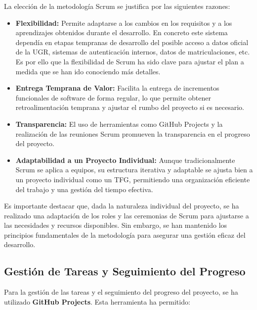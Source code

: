 La elección de la metodología Scrum se justifica por las siguientes razones:

\begin{itemize}
    \item \textbf{Flexibilidad:} Permite adaptarse a los cambios en los requisitos y a los aprendizajes obtenidos durante el desarrollo. En concreto este sistema dependía en etapas tempranas de desarrollo del posible acceso a datos oficial de la UGR, sistemas de autenticación internos, datos de matriculaciones, etc. Es por ello que la flexibilidad de Scrum ha sido clave para ajustar el plan a medida que se han ido conociendo más detalles.
    \item \textbf{Entrega Temprana de Valor:} Facilita la entrega de incrementos funcionales de software de forma regular, lo que permite obtener retroalimentación temprana y ajustar el rumbo del proyecto si es necesario.
    \item \textbf{Transparencia:} El uso de herramientas como GitHub Projects y la realización de las reuniones Scrum promueven la transparencia en el progreso del proyecto.
    \item \textbf{Adaptabilidad a un Proyecto Individual:} Aunque tradicionalmente Scrum se aplica a equipos, su estructura iterativa y adaptable se ajusta bien a un proyecto individual como un TFG, permitiendo una organización eficiente del trabajo y una gestión del tiempo efectiva.
\end{itemize}

Es importante destacar que, dada la naturaleza individual del proyecto, se ha realizado una adaptación de los roles y las ceremonias de Scrum para ajustarse a las necesidades y recursos disponibles. 
Sin embargo, se han mantenido los principios fundamentales de la metodología para asegurar una gestión eficaz del desarrollo.

\subsection{Gestión de Tareas y Seguimiento del Progreso}

Para la gestión de las tareas y el seguimiento del progreso del proyecto, se ha utilizado \textbf{GitHub Projects}\cite{calendarugr_github}. Esta herramienta ha permitido:

